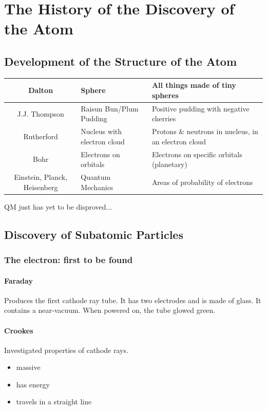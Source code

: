 \documentclass[a4paper, 8pt]{memoir}
\begin{document}
\chapter{The History of the Discovery of the Atom}
\section{Development of the Structure of the Atom}
\begin{tabular}{|c||p{2in}|p{2in}|}
\hline
Dalton & Sphere & All things made of tiny spheres \\ \hline
J.J. Thompson & Raisun Bun/Plum Pudding & Positive pudding with negative cherries \\ \hline
Rutherford & Nucleus with electron cloud & Protons \& neutrons in nucleus, \newline in an electron cloud \\ \hline
Bohr & Electrons on orbitals & Electrons on specific orbitals (planetary) \\ \hline
Einstein, Planck, Heisenberg & Quantum Mechanics & Areas of probability of electrons \\ \hline
\end{tabular}
QM just has yet to be disproved...
\section{Discovery of Subatomic Particles}
\subsection{The electron: first to be found}
\subsubsection{Faraday}
Produces the first cathode ray tube. It has two electrodes and is made of glass. It contains a near-vacuum. When powered on, the tube glowed green.
\subsubsection{Crookes}
Investigated properties of cathode rays.
\begin{itemize}
\item massive
\item has energy
\item travels in a straight line
\end{itemize}
\end{document}
